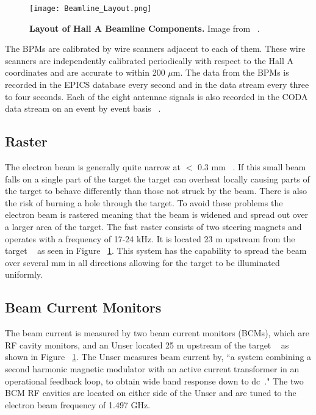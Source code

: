 \begin{figure}[!ht]
\begin{center}
\texttt{[image: Beamline\_Layout.png]}
\end{center}
\caption[Layout of Hall A Beamline Components]{
{\bf{Layout of Hall A Beamline Components.}} Image from ~\cite{Thesis:Wang}.}
\label{fig:beamline}
\end{figure}

The BPMs are calibrated by wire scanners adjacent to each of them. These wire scanners are independently calibrated periodically with respect to the Hall A coordinates and are accurate to within 200 $\mu$m. The data from the BPMs is recorded in the EPICS database every second and in the data stream every three to four seconds. Each of the eight antennae signals is also recorded in the CODA data stream on an event by event basis ~\cite{Thesis:Ye}. 

\subsection{Raster}
\label{ssec:raster}

The electron beam is generally quite narrow at $<$ 0.3 mm ~\cite{Thesis:Wang}. If this small beam falls on a single part of the target the target can overheat locally causing parts of the target to behave differently than those not struck by the beam. There is also the risk of burning a hole through the target. To avoid these problems the electron beam is rastered meaning that the beam is widened and spread out over a larger area of the target. The fast raster consists of two steering magnets and operates with a frequency of 17-24 kHz. It is located 23 m upstream from the target ~\cite{Article:HallA} as seen in Figure ~\ref{fig:beamline}. This system has the capability to spread the beam over several mm in all directions allowing for the target to be illuminated uniformly. 

\subsection{Beam Current Monitors}
\label{ssec:bcms}

The beam current is measured by two beam current monitors (BCMs), which are RF cavity monitors, and an Unser located 25 m upstream of the target ~\cite{Article:HallA} as shown in Figure ~\ref{fig:beamline}. The Unser measures beam current by, ``a system combining a second harmonic magnetic modulator with an active current transformer in an operational feedback loop, to obtain wide band response down to dc~\cite{Article:Unser}." The two BCM RF cavities are located on either side of the Unser and are tuned to the electron beam frequency of 1.497 GHz. 

